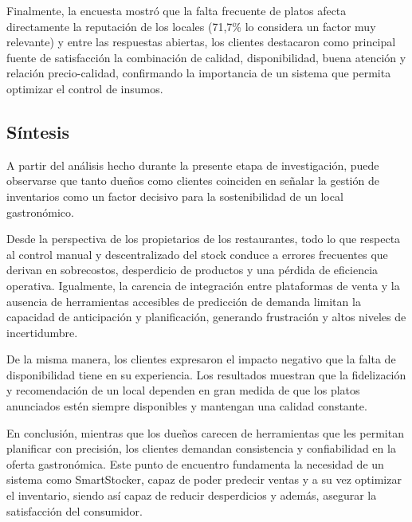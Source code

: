 Finalmente, la encuesta mostró que la falta frecuente de platos afecta directamente la reputación de los locales (71,7\% lo considera un factor muy relevante) y entre las respuestas abiertas, los clientes destacaron como principal fuente de satisfacción la combinación de calidad, disponibilidad, buena atención y relación precio-calidad, confirmando la importancia de un sistema que permita optimizar el control de insumos.

\subsection{Síntesis}\label{sec:sintesis-user-research}

A partir del análisis hecho durante la presente etapa de investigación, puede observarse que tanto dueños como clientes coinciden en señalar la gestión de inventarios como un factor decisivo para la sostenibilidad de un local gastronómico. 

Desde la perspectiva de los propietarios de los restaurantes, todo lo que respecta al control manual y descentralizado del stock conduce a errores frecuentes que derivan en sobrecostos, desperdicio de productos y una pérdida de eficiencia operativa. Igualmente, la carencia de integración entre plataformas de venta y la ausencia de herramientas accesibles de predicción de demanda limitan la capacidad de anticipación y planificación, generando frustración y altos niveles de incertidumbre.

De la misma manera, los clientes expresaron el impacto negativo que la falta de disponibilidad tiene en su experiencia. Los resultados muestran que la fidelización y recomendación de un local dependen en gran medida de que los platos anunciados estén siempre disponibles y mantengan una calidad constante.

En conclusión, mientras que los dueños carecen de herramientas que les permitan planificar con precisión, los clientes demandan consistencia y confiabilidad en la oferta gastronómica. Este punto de encuentro fundamenta la necesidad de un sistema como SmartStocker, capaz de poder predecir ventas y a su vez optimizar el inventario, siendo así capaz de reducir desperdicios y además, asegurar la satisfacción del consumidor.

